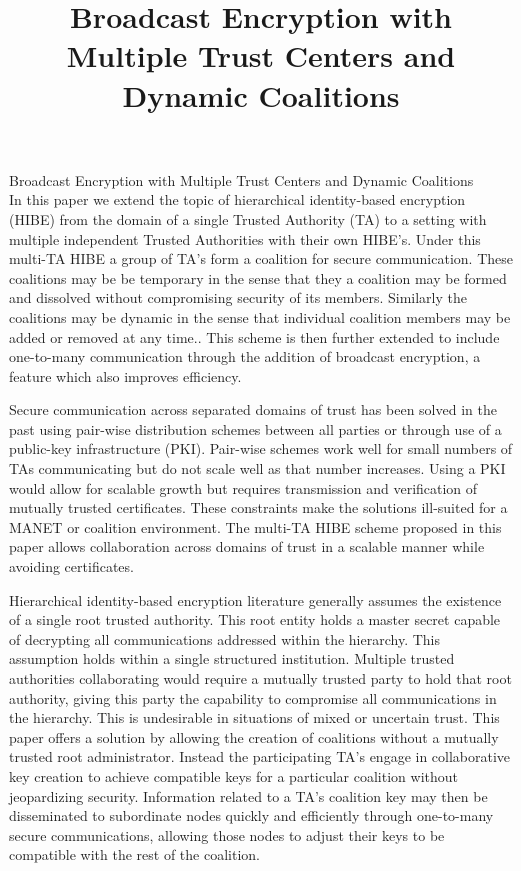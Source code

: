 \documentclass[10pt]{llncs}
\title{Broadcast Encryption with Multiple Trust Centers and Dynamic Coalitions}
\author{}
\institute{}
\begin{document}


{\center\Large Broadcast Encryption with Multiple Trust Centers and Dynamic Coalitions}
\\

In this paper we extend the topic of hierarchical identity-based encryption (HIBE) from the domain of a single Trusted Authority (TA) to a setting with multiple independent Trusted Authorities with their own HIBE's. Under this multi-TA HIBE a group of TA's form a coalition for secure communication. These coalitions may be be temporary in the sense that they a coalition may be formed and dissolved without compromising security of its members. Similarly the coalitions may be dynamic in the sense that individual coalition members may be added or removed at any time.. This scheme is then further extended to include one-to-many communication through the addition of broadcast encryption, a feature which also improves efficiency.

Secure communication across separated domains of trust has been solved in the past using pair-wise distribution schemes between all parties or through use of a public-key infrastructure (PKI). Pair-wise schemes work well for small numbers of TAs communicating but do not scale well as that number increases. Using a PKI would allow for scalable growth but requires transmission and verification of mutually trusted certificates. These constraints make the solutions ill-suited for a MANET or coalition environment. The multi-TA HIBE scheme proposed in this paper allows collaboration across domains of trust in a scalable manner while avoiding certificates.

Hierarchical identity-based encryption literature generally assumes the existence of a single root trusted authority. This root entity holds a master secret capable of decrypting all communications addressed within the hierarchy. This assumption holds within a single structured institution. Multiple trusted authorities collaborating would require a mutually trusted party to hold that root authority, giving this party the capability to compromise all communications in the hierarchy. This is undesirable in situations of mixed or uncertain trust. This paper offers a solution by allowing the creation of coalitions without a mutually trusted root administrator. Instead the participating TA's engage in collaborative key creation to achieve compatible keys for a particular coalition without jeopardizing security. Information related to a TA's coalition key may then be disseminated to subordinate nodes quickly and efficiently through one-to-many secure communications, allowing those nodes to adjust their keys to be compatible with the rest of the coalition.
\end{document}
